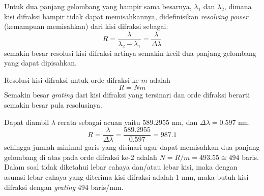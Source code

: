 \documentclass[11pt,fleqn]{exam}
\begin{document}
\begin{questions}
Untuk dua panjang gelombang yang hampir sama besarnya, $\lambda_1$ dan $\lambda_2$, dimana kisi difraksi hampir tidak dapat memisahkannya, didefinisikan \textit{resolving power} (kemampuan memisahkan) dari kisi difraksi sebagai:
\begin{equation*}
R = \frac{\lambda}{\lambda_2 - \lambda_1} = \frac{\lambda}{\Delta \lambda}
\end{equation*}
semakin besar resolusi kisi difraksi artinya semakin kecil dua panjang gelombang yang dapat dipisahkan.

Resolusi kisi difraksi untuk orde difraksi ke-$m$ adalah 
\begin{equation*}
R = Nm
\end{equation*}
Semakin besar \textit{grating} dari kisi difraksi yang tersinari dan orde difraksi berarti semakin besar pula resolusinya.

Dapat diambil $\lambda$ rerata sebagai acuan yaitu $589.2955$ nm, dan $\Delta \lambda = 0.597$ nm.
\begin{equation*}
R = \frac{\lambda}{\Delta \lambda} = \frac{589.2955}{0.597} = 987.1
\end{equation*}
sehingga jumlah minimal garis yang disinari agar dapat memisahkan dua panjang gelombang di atas pada orde difraksi ke-2 adalah $N = R/m = 493.55 \cong 494$ baris. Dalam soal tidak diketahui lebar cahaya dan/atau lebar kisi, maka dengan asumsi lebar cahaya yang diterima kisi difraksi adalah 1 mm, maka butuh kisi difraksi dengan \textit{grating} 494 baris/mm.

\end{questions}
\end{document}
